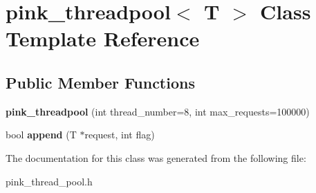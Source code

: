 \hypertarget{classpink__threadpool}{}\section{pink\+\_\+threadpool$<$ T $>$ Class Template Reference}
\label{classpink__threadpool}
\subsection*{Public Member Functions}
\begin{DoxyCompactItemize}
\item 
\mbox{\label{classpink__threadpool_a75dcfa67e83f32078d65f263cae5b118}} 
{\bfseries pink\+\_\+threadpool} (int thread\+\_\+number=8, int max\+\_\+requests=100000)
\item 
\mbox{\label{classpink__threadpool_ae4bead5c98203b97c3caeae43296d295}} 
bool {\bfseries append} (T $\ast$request, int flag)
\end{DoxyCompactItemize}


The documentation for this class was generated from the following file\+:\begin{DoxyCompactItemize}
\item 
pink\+\_\+thread\+\_\+pool.\+h\end{DoxyCompactItemize}
